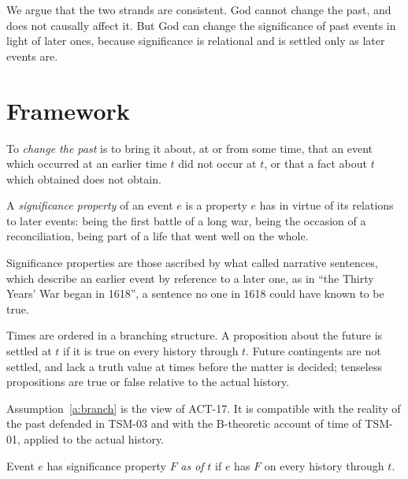 \documentclass{situationist-preprint}
\begin{document}
We argue that the two strands are consistent. God cannot change the past, and does not causally affect it. But God can change the significance of past events in light of later ones, because significance is relational and is settled only as later events are.

\section{Framework}

\begin{definition}\label{d:change}
To \emph{change the past} is to bring it about, at or from some time, that an event which occurred at an earlier time $t$ did not occur at $t$, or that a fact about $t$ which obtained does not obtain.
\end{definition}

\begin{definition}[Significance]\label{d:sig}
A \emph{significance property} of an event $e$ is a property $e$ has in virtue of its relations to later events: being the first battle of a long war, being the occasion of a reconciliation, being part of a life that went well on the whole.
\end{definition}

Significance properties are those ascribed by what \citet[ch.~8]{Danto1965} called narrative sentences, which describe an earlier event by reference to a later one, as in \enquote{the Thirty Years' War began in 1618}, a sentence no one in 1618 could have known to be true.

\begin{assumption}[Branching]\label{a:branch}
Times are ordered in a branching structure. A proposition about the future is settled at $t$ if it is true on every history through $t$. Future contingents are not settled, and lack a truth value at times before the matter is decided; tenseless propositions are true or false relative to the actual history.
\end{assumption}

Assumption~\ref{a:branch} is the view of ACT-17. It is compatible with the reality of the past defended in TSM-03 and with the B-theoretic account of time of TSM-01, applied to the actual history.

\begin{definition}\label{d:settled}
Event $e$ has significance property $F$ \emph{as of} $t$ if $e$ has $F$ on every history through $t$.
\end{definition}
\end{document}
